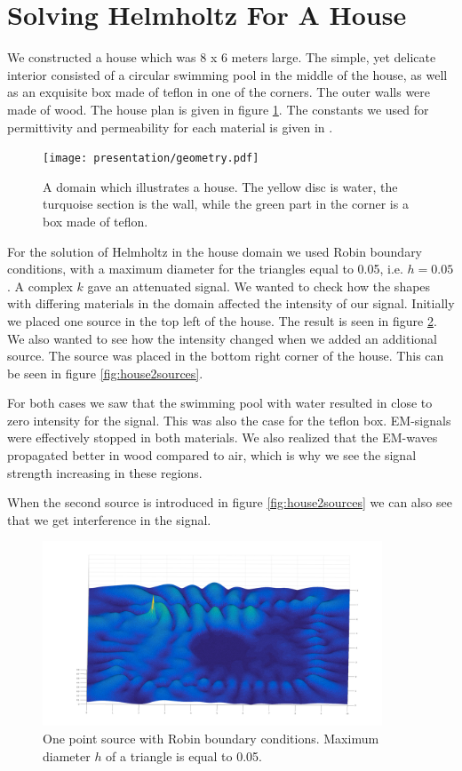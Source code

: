 \documentclass[10pt,a4paper]{article}
\begin{document}
\section*{Solving Helmholtz For A House}
We constructed a house which was 8 x 6 meters large. The simple, yet delicate interior consisted of a circular swimming pool in the middle of the house, as well as an exquisite box made of teflon in one of the corners. The outer walls were made of wood. The house plan is given in figure \ref{fig:housePlan}. The constants we used for permittivity and permeability for each material is given in \cite{dielectric}.

\begin{figure}[H]
\centering
    \texttt{[image: presentation/geometry.pdf]}
	\caption{A domain which illustrates a house. The yellow disc is water, the turquoise section is the wall, while the green part in the corner is a box made of teflon.}
  \label{fig:housePlan}
\end{figure}

For the solution of Helmholtz in the house domain we used Robin boundary conditions, with a maximum diameter for the triangles equal to 0.05, i.e. $h = 0.05$. A complex $k$ gave an attenuated signal. We wanted to check how the shapes with differing materials in the domain affected the intensity of our signal. Initially we placed one source in the top left of the house. The result is seen in figure \ref{fig:house1source}. We also wanted to see how the intensity changed when we added an additional source. The source was placed in the bottom right corner of the house. This can be seen in figure \ref{fig:house2sources}. 

For both cases we saw that the swimming pool with water resulted in close to zero intensity for the signal. This was also the case for the teflon box. EM-signals were effectively stopped in both materials. We also realized that the EM-waves propagated better in wood compared to air, which is why we see the signal strength increasing in these regions.

When the second source is introduced in figure \ref{fig:house2sources} we can also see that we get interference in the signal.

\begin{figure}[H]
\centering
    \includegraphics[width=0.9\textwidth]{figures/house_topleft_source.pdf}
	\caption{One point source with Robin boundary conditions. Maximum diameter $h$ of a triangle is equal to 0.05. }
  \label{fig:house1source}
\end{figure}
\end{document}
